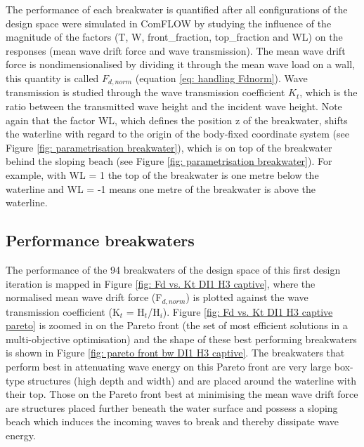 The performance of each breakwater is quantified after all configurations of the design space were simulated in ComFLOW by studying the influence of the magnitude of the factors (T, W, front\_fraction, top\_fraction and WL) on the responses (mean wave drift force and wave transmission). The mean wave drift force is nondimensionalised by dividing it through the mean wave load on a wall, this quantity is called $F_{d,norm}$ (equation \ref{eq: handling Fdnorm}). Wave transmission is studied through the wave transmission coefficient $K_t$, which is the ratio between the transmitted wave height and the incident wave height. Note again that the factor WL, which defines the position z of the breakwater, shifts the waterline with regard to the origin of the body-fixed coordinate system (see Figure \ref{fig: parametrisation breakwater}), which is on top of the breakwater behind the sloping beach (see Figure \ref{fig: parametrisation breakwater}). For example, with WL = 1 the top of the breakwater is one metre below the waterline and WL = -1 means one metre of the breakwater is above the waterline.




\subsection{Performance breakwaters}
\label{sec: DI1 captive H3 performance bw}


The performance of the 94 breakwaters of the design space of this first design iteration is mapped in Figure \ref{fig: Fd vs. Kt DI1 H3 captive}, where the normalised mean wave drift force (F$_{d,norm}$) is plotted against the wave transmission coefficient (K$_t$ = H$_t$/H$_i$). Figure \ref{fig: Fd vs. Kt DI1 H3 captive pareto} is zoomed in on the Pareto front (the set of most efficient solutions in a multi-objective optimisation) and the shape of these best performing breakwaters is shown in Figure \ref{fig: pareto front bw DI1 H3 captive}. The breakwaters that perform best in attenuating wave energy on this Pareto front are very large box-type structures (high depth and width) and are placed around the waterline with their top. Those on the Pareto front best at minimising the mean wave drift force are structures placed further beneath the water surface and possess a sloping beach which induces the incoming waves to break and thereby dissipate wave energy.  


